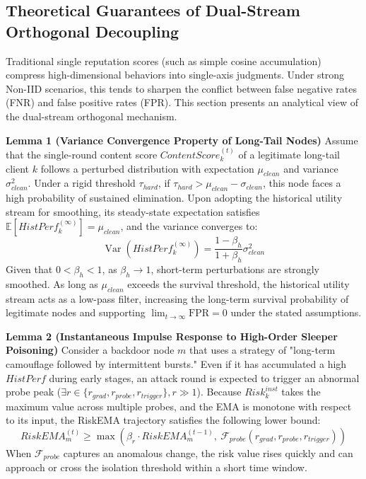 \documentclass[runningheads,orivec]{llncs}
\begin{document}
\subsection{Theoretical Guarantees of Dual-Stream Orthogonal Decoupling}
Traditional single reputation scores (such as simple cosine accumulation) compress high-dimensional behaviors into single-axis judgments. Under strong Non-IID scenarios, this tends to sharpen the conflict between false negative rates (FNR) and false positive rates (FPR). This section presents an analytical view of the dual-stream orthogonal mechanism.

\textbf{Lemma 1 (Variance Convergence Property of Long-Tail Nodes)}
Assume that the single-round content score $ContentScore_{k}^{(t)}$ of a legitimate long-tail client $k$ follows a perturbed distribution with expectation $\mu_{clean}$ and variance $\sigma_{clean}^2$. Under a rigid threshold $\tau_{hard}$, if $\tau_{hard} > \mu_{clean} - \sigma_{clean}$, this node faces a high probability of sustained elimination. Upon adopting the historical utility stream for smoothing, its steady-state expectation satisfies $\mathbb{E}[HistPerf_k^{(\infty)}] = \mu_{clean}$, and the variance converges to:
\begin{equation}
    \operatorname{Var}(HistPerf_{k}^{(\infty)}) = \frac{1-\beta_h}{1+\beta_h} \sigma_{clean}^{2}
\end{equation}
Given that $0 < \beta_h < 1$, as $\beta_h \to 1$, short-term perturbations are strongly smoothed. As long as $\mu_{clean}$ exceeds the survival threshold, the historical utility stream acts as a low-pass filter, increasing the long-term survival probability of legitimate nodes and supporting $\lim_{t \to \infty} \text{FPR} = 0$ under the stated assumptions.

\textbf{Lemma 2 (Instantaneous Impulse Response to High-Order Sleeper Poisoning)}
Consider a backdoor node $m$ that uses a strategy of "long-term camouflage followed by intermittent bursts." Even if it has accumulated a high $HistPerf$ during early stages, an attack round is expected to trigger an abnormal probe peak ($\exists r \in \{r_{grad}, r_{probe}, r_{trigger}\}, r \gg 1$). Because $Risk_k^{inst}$ takes the maximum value across multiple probes, and the EMA is monotone with respect to its input, the RiskEMA trajectory satisfies the following lower bound:
\begin{equation}
    RiskEMA_m^{(t)} \ge \max \left( \beta_r \cdot RiskEMA_m^{(t-1)},\ \mathcal{F}_{probe}(r_{grad}, r_{probe}, r_{trigger}) \right)
\end{equation}
When $\mathcal{F}_{probe}$ captures an anomalous change, the risk value rises quickly and can approach or cross the isolation threshold within a short time window.
\end{document}
